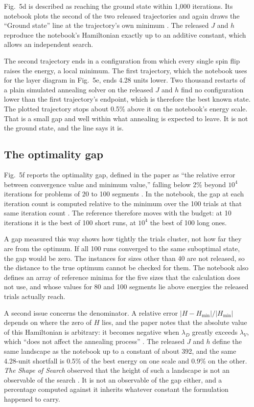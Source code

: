 \documentclass[11pt]{article}
\theoremstyle{definition}
\theoremstyle{remark}
\begin{document}
Fig.~5d is described as reaching the ground state within 1,000 iterations. Its notebook plots the second of the two released trajectories and again draws the ``Ground state'' line at the trajectory's own minimum \cite{vsimrepo}. The released $J$ and $h$ reproduce the notebook's Hamiltonian exactly up to an additive constant, which allows an independent search.

The second trajectory ends in a configuration from which every single spin flip raises the energy, a local minimum. The first trajectory, which the notebook uses for the layer diagram in Fig.~5e, ends 4.28 units lower. Two thousand restarts of a plain simulated annealing solver on the released $J$ and $h$ find no configuration lower than the first trajectory's endpoint, which is therefore the best known state. The plotted trajectory stops about 0.5\% above it on the notebook's energy scale. That is a small gap and well within what annealing is expected to leave. It is not the ground state, and the line says it is.

\subsection*{The optimality gap}

Fig.~5f reports the optimality gap, defined in the paper as ``the relative error between convergence value and minimum value,'' falling below 2\% beyond $10^4$ iterations for problems of 20 to 100 segments \cite{li2026}. In the notebook, the gap at each iteration count is computed relative to the minimum over the 100 trials at that same iteration count \cite{vsimrepo}. The reference therefore moves with the budget: at 10 iterations it is the best of 100 short runs, at $10^4$ the best of 100 long ones.

A gap measured this way shows how tightly the trials cluster, not how far they are from the optimum. If all 100 runs converged to the same suboptimal state, the gap would be zero. The instances for sizes other than 40 are not released, so the distance to the true optimum cannot be checked for them. The notebook also defines an array of reference minima for the five sizes that the calculation does not use, and whose values for 80 and 100 segments lie above energies the released trials actually reach.

A second issue concerns the denominator. A relative error $|H - H_{\min}|/|H_{\min}|$ depends on where the zero of $H$ lies, and the paper notes that the absolute value of this Hamiltonian is arbitrary: it becomes negative when $\lambda_D$ greatly exceeds $\lambda_V$, which ``does not affect the annealing process'' \cite{li2026}. The released $J$ and $h$ define the same landscape as the notebook up to a constant of about 392, and the same 4.28-unit shortfall is 0.5\% of the best energy on one scale and 0.9\% on the other. \emph{The Shape of Search} observed that the height of such a landscape is not an observable of the search \cite{flyxion-shape}. It is not an observable of the gap either, and a percentage computed against it inherits whatever constant the formulation happened to carry.
\end{document}
